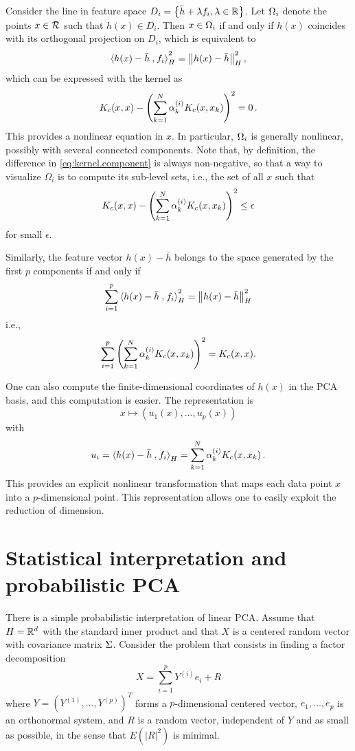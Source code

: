  Consider the line in
feature space $D_i = \left\{ \bar h + \lambda f_i, \lambda\in {\mathbb{R}} \right\}$. Let $\Omega_i$ denote the points $x\in {\mathcal R}$ such that $h(x) \in D_i$. Then $x\in \Omega_i$ if and only if  $h(x)$  coincides with its orthogonal projection on $D_i$, which
is equivalent to
$$
{\langle {h(x)-\bar h}\mathbin{,} {f_i}\rangle}_H^2 = \left\| h(x) - \bar h \right\|_H^2,
$$
which can be expressed with the kernel as
\begin{equation}
\label{eq:kernel.component}
K_c(x,x) - \left(\sum_{k=1}^N \alpha_{k}^{(i)} K_c(x,x_k)\right)^2 = 0\,.
\end{equation}
This provides a  nonlinear equation in $x$. In particular, $\Omega_i$ is generally nonlinear, possibly with several connected components. Note that, by definition, the difference in \cref{eq:kernel.component} is always non-negative, so that a way to visualize $\Omega_i$ is to compute its sub-level sets, i.e., the set of all $x$ such that
\[
K_c(x,x) - \left(\sum_{k=1}^N \alpha_{k}^{(i)} K_c(x,x_k)\right)^2 \leq \epsilon
\]
for small $\epsilon$.

Similarly, the feature vector $h(x) - \bar h$ belongs to the space generated by the first $p$ components if and only if
\[
\sum_{i=1}^p {\langle {h(x)-\bar h}\mathbin{,} {f_i}\rangle}_H^2 = \left\| h(x) - \bar h \right\|_H^2 
\]
i.e., 
$$
\sum_{i=1}^p \left(\sum_{k=1}^N \alpha_{k}^{(i)} K_c(x,x_k)\right)^2 = K_c(x,x).
$$

\bigskip

One can also compute the finite-dimensional coordinates
of $h(x)$ in the PCA basis, and this computation is easier. The representation is
\[
x \mapsto (u_1(x), \ldots, u_p(x))
\]
with 
\[
u_i = {\langle {h(x) - \bar h}\mathbin{,} {f_i}\rangle}_H =  \sum_{k=1}^N \alpha_{k}^{(i)} K_c(x,
x_k) \,.
\]
This provides an explicit nonlinear transformation that maps each data point $x$ into a $p$-dimensional point.
This representation allows one to easily exploit the reduction of dimension.

\section{Statistical interpretation and probabilistic PCA}

There is a simple probabilistic interpretation of linear PCA. Assume that $H={\mathbb{R}}^d$ with the standard inner product and 
that $X$ is a centered  random vector with covariance
matrix $\Sigma$. Consider the problem that consists in finding a
factor decomposition 
\[
X = \sum_{i=1}^p Y^{(i)} e_i + R
\]
 where $Y = (Y^{(1)}, \ldots, Y^{(p)})^T$ forms
a $p$-dimensional centered  vector, $e_1, \ldots,
e_p$ is an orthonormal system, and $R$ is a random vector,
independent of $Y$ and as small as possible, in the
sense that $E(|R|^2)$ is minimal. 

